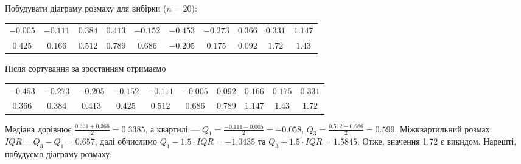 \begin{example}
    Побудувати діаграму розмаху для вибірки ($n = 20$):
    \begin{center}
        \begin{tabular}{c c c c c c c c c c}
            $-0.005$ & $-0.111$ & $0.384$ & $0.413$ & $-0.152$ & $-0.453$ & $-0.273$ & $0.366$ & $0.331$ & $1.147$ \\
            $0.425$ & $0.166$ & $0.512$ & $0.789$ & $0.686$ & $-0.205$ & $0.175$ & $0.092$ & $1.72$ & $1.43$
            \end{tabular}
    \end{center}
    Після сортування за зростанням отримаємо 
    \begin{center}
        \begin{tabular}{c c c c c c c c c c}
            $-0.453$ & $-0.273$ & $-0.205$ & $-0.152$ & $-0.111$ & $-0.005$ & $0.092$ & $0.166$ & $0.175$ & $0.331$ \\
            $0.366$ & $0.384$ & $0.413$ & $0.425$ & $0.512$ & $0.686$ & $0.789$ & $1.147$ & $1.43$ & $1.72$
            \end{tabular}
    \end{center}
    Медіана дорівнює $\frac{0.331+0.366}{2} = 0.3385$, а квартилі --- $Q_1 = \frac{-0.111 - 0.005}{2} = -0.058$,
    $Q_3 = \frac{0.512 + 0.686}{2} = 0.599$. Міжквартильний розмах ${IQR} = Q_3 - Q_1 = 0.657$, далі обчислимо
    $Q_1 - 1.5\cdot{IQR} = -1.0435$ та $Q_3 + 1.5\cdot{IQR} = 1.5845$. Отже, значення 1.72 є викидом.
    Нарешті, побудуємо діаграму розмаху:
    \begin{center}
\end{center}
\end{example}
